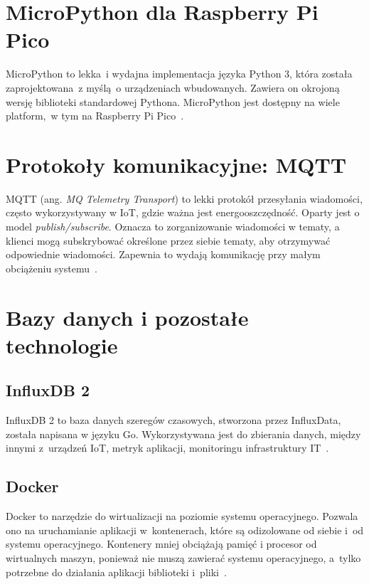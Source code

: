 \section{MicroPython dla Raspberry Pi Pico}
MicroPython to lekka~i wydajna implementacja języka Python 3, która została zaprojektowana~z myślą~o urządzeniach wbudowanych.
Zawiera on okrojoną wersję biblioteki standardowej Pythona.
MicroPython jest dostępny na wiele platform,~w tym na Raspberry Pi Pico~\cite{PICO:micropython}.

\section{Protokoły komunikacyjne: MQTT}

MQTT (ang. \emph{MQ Telemetry Transport}) to lekki protokół przesyłania wiadomości, często wykorzystywany w IoT, gdzie ważna jest energooszczędność.
Oparty jest o model \emph{publish/subscribe}.
Oznacza to zorganizowanie wiadomości w tematy, a klienci mogą subskrybować określone przez siebie tematy, aby otrzymywać odpowiednie wiadomości.
Zapewnia to wydają komunikację przy małym obciążeniu systemu~\cite{protocol:mqtt}.

\section{Bazy danych i pozostałe technologie}
\subsection{InfluxDB 2}
InfluxDB 2 to baza danych szeregów czasowych, stworzona przez InfluxData, została napisana w języku Go.
Wykorzystywana jest do zbierania danych, między innymi z~urządzeń IoT, metryk aplikacji, monitoringu infrastruktury IT~\cite{tool:influxdb}.

\subsection{Docker}
Docker to narzędzie do wirtualizacji na poziomie systemu operacyjnego.
Pozwala ono na uruchamianie aplikacji w~kontenerach, które są odizolowane od siebie i~od systemu operacyjnego.
Kontenery mniej obciążają pamięć i procesor od wirtualnych maszyn, ponieważ nie muszą zawierać systemu operacyjnego, a~tylko potrzebne do działania aplikacji biblioteki i~pliki~\cite{tool:docker}.

